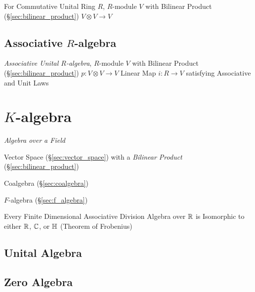 For Commutative Unital Ring $R$, $R$-module $V$ with Bilinear Product
(\S\ref{sec:bilinear_product}) $V \otimes V \rightarrow V$



\subsection{Associative $R$-algebra}\label{sec:associative_r_algebra}

\emph{Associative Unital $R$-algebra}, $R$-module $V$ with Bilinear
Product (\S\ref{sec:bilinear_product}) $p : V \otimes V \rightarrow V$
Linear Map $i : R \rightarrow V$ satisfying Associative and Unit Laws



\section{$K$-algebra}\label{sec:k_algebra}

\emph{Algebra over a Field}

Vector Space (\S\ref{sec:vector_space}) with a \emph{Bilinear Product}
(\S\ref{sec:bilinear_product})

Coalgebra (\S\ref{sec:coalgebra})

$F$-algebra (\S\ref{sec:f_algebra})

Every Finite Dimensional Associative Division Algebra over $\mathbb{R}$ is
Isomorphic to either $\mathbb{R}$, $\mathbb{C}$, or $\mathbb{H}$ (Theorem of
Frobenius) %



\subsection{Unital Algebra}\label{sec:unital_algebra}

\subsection{Zero Algebra}\label{sec:zero_algebra}


